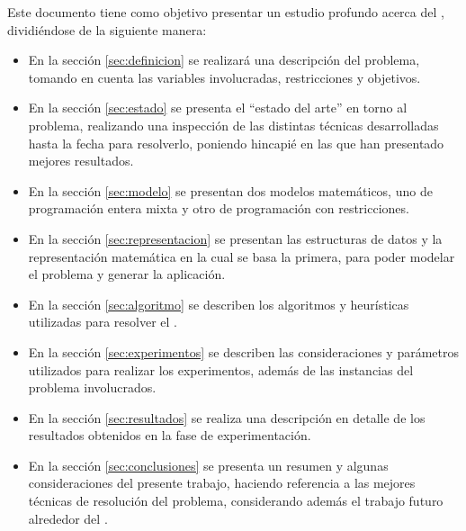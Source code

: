 \documentclass[../informe2.tex]{subfiles}
\begin{document}
Este documento tiene como objetivo presentar un estudio profundo acerca del \mrp, dividiéndose de la siguiente manera:
\begin{itemize}
	\item En la sección \ref{sec:definicion} se realizará una descripción del problema, tomando en cuenta las variables involucradas, restricciones y objetivos.
	\item En la sección \ref{sec:estado} se presenta el ``estado del arte'' en torno al problema, realizando una inspección de las distintas técnicas desarrolladas hasta la fecha para resolverlo, poniendo hincapié en las que han presentado mejores resultados.
	\item En la sección \ref{sec:modelo} se presentan dos modelos matemáticos, uno de programación entera mixta y otro de programación con restricciones.
	\item En la sección \ref{sec:representacion} se presentan las estructuras de datos y la representación matemática en la cual se basa la primera, para poder modelar el problema y generar la aplicación.
	\item En la sección \ref{sec:algoritmo} se describen los algoritmos y heurísticas utilizadas para resolver el \mrp.
	\item En la sección \ref{sec:experimentos} se describen las consideraciones y parámetros utilizados para realizar los experimentos, además de las instancias del problema involucrados.
	\item En la sección \ref{sec:resultados} se realiza una descripción en detalle de los resultados obtenidos en la fase de experimentación.
	\item En la sección \ref{sec:conclusiones} se presenta un resumen y algunas consideraciones del presente trabajo, haciendo referencia a las mejores técnicas de resolución del problema, considerando además el trabajo futuro alrededor del \mrp.
\end{itemize}
\end{document}

